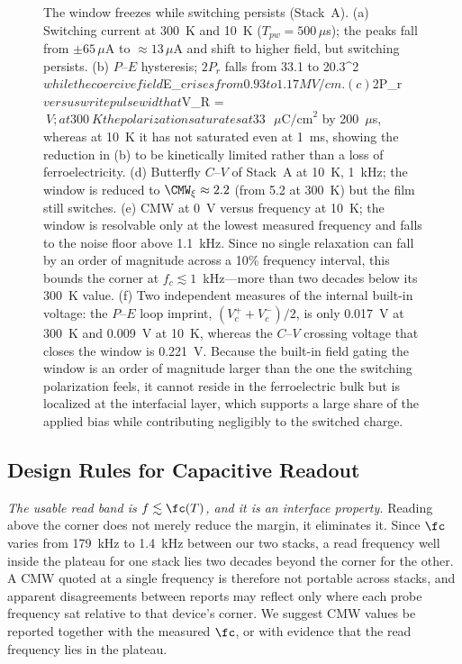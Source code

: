 \begin{figure}[H]
     \caption{The window freezes while switching persists (Stack~A). (a) Switching
current at 300~K and 10~K ($T_{pw} = 500\,\mu$s); the peaks fall from
$\pm65\,\mu$A to $\approx13\,\mu$A and shift to higher field, but switching
persists. (b) $P$--$E$ hysteresis; $2P_r$ falls from 33.1 to 20.3\text{ }\mu{}^2$ while
the coercive field $E_c$ rises from 0.93 to 1.17 MV/cm{}. (c) $2P_r$ versus write
pulse width at $V_R = $~V; at 300~K the polarization saturates at 33\text{ }\mu\text{C/cm}^2$
by 200~$\mu$s, whereas at 10~K it has not saturated even at 1~ms, showing the
reduction in (b) to be kinetically limited rather than a loss of
ferroelectricity. (d) Butterfly $C$--$V$ of Stack~A at 10~K, 1~kHz; the window
is reduced to $\CMW_\xi \approx 2.2$ (from 5.2 at 300~K) but the film still
switches. (e) CMW at 0~V versus frequency at 10~K; the window is resolvable
only at the lowest measured frequency and falls to the noise floor above
1.1~kHz. Since no single relaxation can fall by an order of magnitude across a
10\% frequency interval, this bounds the corner at $f_c \lesssim 1$~kHz---more
than two decades below its 300~K value. (f) Two independent measures of the
internal built-in voltage: the $P$--$E$ loop imprint, $(V_c^+ + V_c^-)/2$, is
only 0.017~V at 300~K and 0.009~V at 10~K, whereas the $C$--$V$ crossing voltage
that closes the window is 0.221~V. Because the built-in field gating the window
is an order of magnitude larger than the one the switching polarization feels,
it cannot reside in the ferroelectric bulk but is localized at the interfacial
layer, which supports a large share of the applied bias while contributing
negligibly to the switched charge.}
     \label{fig:figure1}
\end{figure}



\subsection{Design Rules for Capacitive Readout}
\textit{The usable read band is $f \lesssim \fc(T)$, and it is an interface
property.} Reading above the corner does not merely reduce the margin, it
eliminates it. Since $\fc$ varies from 179~kHz to 1.4~kHz between our two
stacks, a read frequency well inside the plateau for one stack lies two
decades beyond the corner for the other. A CMW quoted at a single frequency
is therefore not portable across stacks, and apparent disagreements between
reports may reflect only where each probe frequency sat relative to that
device's corner. We suggest CMW values be reported together with the measured
$\fc$, or with evidence that the read frequency lies in the plateau.

